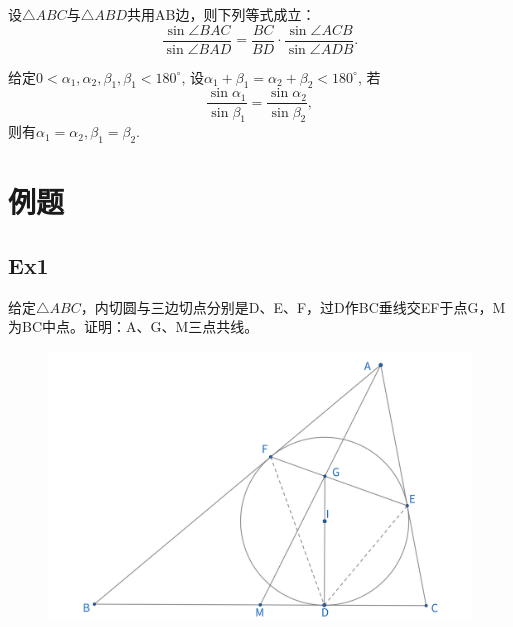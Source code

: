 \documentclass{article}
\begin{document}
\begin{proposition}
    设$\triangle ABC$与$\triangle ABD$共用AB边，则下列等式成立：
    $$
    \frac{\sin \angle BAC}{\sin \angle BAD} = \frac{BC}{BD} \cdot \frac{\sin\angle ACB}{\sin\angle ADB}.
    $$
\end{proposition}



\begin{proposition}
    给定$0<\alpha_1,\alpha_2,\beta_1,\beta_1<180^\circ$, 设$\alpha_1+\beta_1 = \alpha_2+\beta_2 <180^\circ$, 若
    $$
    \frac{\sin \alpha_1}{\sin \beta_1}=\frac{\sin \alpha_2}{\sin\beta_2},
    $$
    则有$\alpha_1 = \alpha_2, \beta_1=\beta_2.$
\end{proposition}


\newpage 
\section{例题}
\subsection{Ex1}
给定$\triangle ABC$，内切圆与三边切点分别是D、E、F，过D作BC垂线交EF于点G，M为BC中点。证明：A、G、M三点共线。
\begin{figure}[htbp]
    \centering
    \includegraphics[width=0.8\linewidth]{figures/Ex1.png}
\end{figure}
\end{document}
